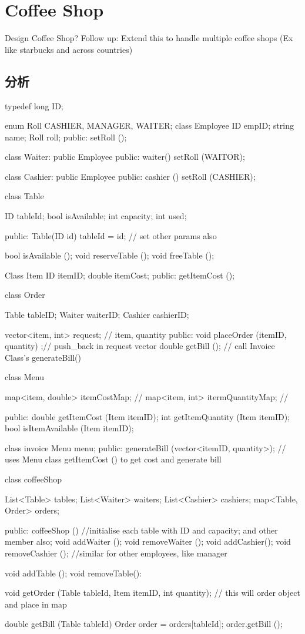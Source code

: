 \section{Coffee Shop}
Design Coffee Shop? Follow up: Extend this to handle multiple coffee shops (Ex like starbucks and across countries)

\subsection{分析}
\begin{Code}
	typedef long ID;
	
	enum Roll {CASHIER, MANAGER, WAITER};
	class Employee{
		ID empID;
		string name;
		Roll roll;
		public:
		setRoll ();
	}
	
	class Waiter: public Employee{
	public:
		waiter() {	setRoll (WAITOR); }
	}
	
	class Cashier: public Employee{
	public:
		cashier () {	setRoll (CASHIER); }
	}
	
	class Table{
		ID tableId;
		bool isAvailable;
		int capacity;
		int used;
		
	public:
		Table(ID id) {tableId = id; // set other params also}
		
		bool isAvailable ();
		void reserveTable ();
		void freeTable ();
	}
	
	Class Item{
		ID itemID;
		double itemCost;
		public:
		getItemCost ();
	}
	
	class Order{
		Table tableID;
		Waiter waiterID;
		Cashier cashierID;
		
		vector<item, int> request; // item, quantity
		public:
		void placeOrder (itemID, quantity) ;// push_back in request vector
		double getBill (); // call Invoice Class's generateBill()
	}
	
	class Menu{
		map<item, double> itemCostMap; //
		map<item, int> itermQuantityMap; //
		
	public:
		double getItemCost (Item itemID);
		int getItemQuantity (Item itemID);
		bool isItemAvailable (Item itemID);
	}
	
	class invoice{
		Menu menu;
	public:
		generateBill (vector<itemID, quantity>); // uses Menu class getItemCost () to get cost and generate bill
	}
	
	
	class coffeeShop{
		List<Table> tables;
		List<Waiter> waiters;
		List<Cashier> cashiers;
		map<Table, Order> orders;
		
	public:
		coffeeShop (){
			//initialise each table with ID and capacity; and other member also;
		}
		void addWaiter ();
		void removeWaiter ();
		void addCashier();
		void removeCashier ();
		//similar for other employees, like manager 
		
		void addTable ();
		void removeTable():
		
		void getOrder (Table tableId, Item itemID, int quantity); // this will order object and place in map
		
		double getBill (Table tableId){ 
			Order order = orders[tableId]; 
			order.getBill ();
		}
	}
\end{Code}

